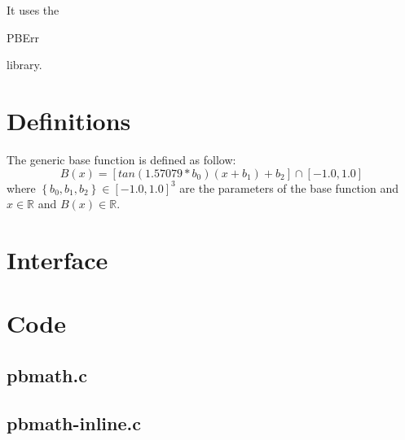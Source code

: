 It uses the \begin{ttfamily}PBErr\end{ttfamily} library.\\

\section{Definitions}

The generic base function is defined as follow:\\
\begin{equation}
B(x)=\left[tan(1.57079*b_0)(x+b_1)+b_2\right]\cap[-1.0,1.0]
\end{equation}
where $\left\lbrace b_0,b_1,b_2\right\rbrace\in[-1.0,1.0]^3$ are the parameters of the base function and $x\in\mathbb{R}$ and $B(x)\in\mathbb{R}$.

\section{Interface}

\begin{scriptsize}
\begin{ttfamily}

\end{ttfamily}
\end{scriptsize}

\section{Code}

\subsection{pbmath.c}

\begin{scriptsize}
\begin{ttfamily}

\end{ttfamily}
\end{scriptsize}

\subsection{pbmath-inline.c}

\begin{scriptsize}
\begin{ttfamily}

\end{ttfamily}
\end{scriptsize}

